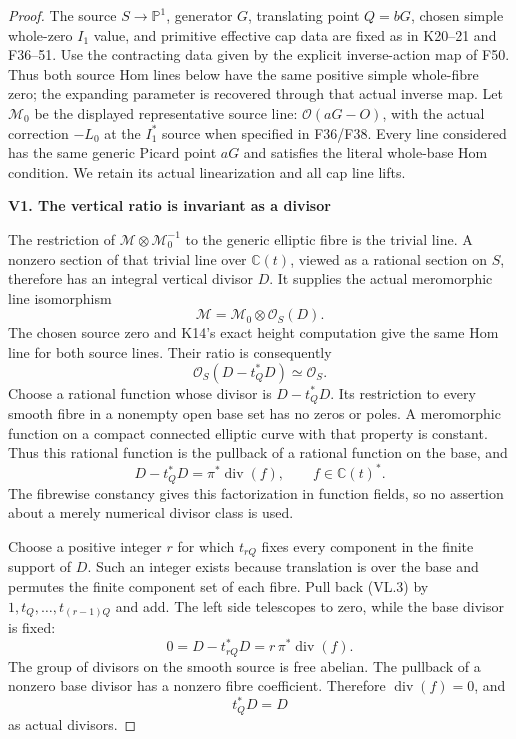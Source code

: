 \begin{proof}
The source \(S\to\mathbb P^1\), generator \(G\), translating point
\(Q=bG\), chosen simple whole-zero \(I_1\) value, and primitive
effective cap data are fixed as in K20--21 and F36--51.
Use the contracting data given by the explicit inverse-action map
of F50. Thus both source Hom lines below have the same positive
simple whole-fibre zero; the expanding parameter is recovered
through that actual inverse map.
Let \(\mathcal M_0\) be the displayed representative source line:
\(\mathcal O(aG-O)\), with the actual correction \(-L_0\) at
the \(I_1^*\) source when specified in F36/F38. Every line
considered has the same generic Picard point \(aG\) and satisfies
the literal whole-base Hom condition. We retain its actual
linearization and all cap line lifts.

\par

\medskip\noindent\textbf{V1. The vertical ratio is invariant as a divisor}

\par\nobreak

The restriction of \(\mathcal M\otimes\mathcal M_0^{-1}\) to the
generic elliptic fibre is the trivial line. A nonzero section of
that trivial line over \(\mathbb C(t)\), viewed as a rational
section on \(S\), therefore has an integral vertical divisor \(D\).
It supplies the actual meromorphic line isomorphism
\[
 \mathcal M=\mathcal M_0\otimes\mathcal O_S(D).
 \tag{VL.1}
\]
The chosen source zero and K14's exact height computation give
the same Hom line for both source lines. Their ratio is consequently
\[
 \mathcal O_S(D-t_Q^*D)\simeq\mathcal O_S.
 \tag{VL.2}
\]
Choose a rational function whose divisor is \(D-t_Q^*D\).
Its restriction to every smooth fibre in a nonempty open
base set has no zeros or poles. A meromorphic function on
a compact connected elliptic curve with that property is
constant. Thus this rational function is the pullback of
a rational function on the base, and
\[
 D-t_Q^*D=\pi^*\operatorname{div}(f),\qquad
                       f\in\mathbb C(t)^* .
 \tag{VL.3}
\]
The fibrewise constancy gives this factorization in function
fields, so no assertion about a merely numerical divisor
class is used.

Choose a positive integer \(r\) for which \(t_{rQ}\) fixes
every component in the finite support of \(D\). Such an
integer exists because translation is over the base and
permutes the finite component set of each fibre. Pull back
(VL.3) by \(1,t_Q,\ldots,t_{(r-1)Q}\) and add. The left
side telescopes to zero, while the base divisor is fixed:
\[
 0=D-t_{rQ}^*D=r\,\pi^*\operatorname{div}(f).
\]
The group of divisors on the smooth source is free abelian.
The pullback of a nonzero base divisor has a nonzero fibre
coefficient. Therefore \(\operatorname{div}(f)=0\), and
\[
                             t_Q^*D=D
 \tag{VL.4}
\]
as actual divisors.


\end{proof}
